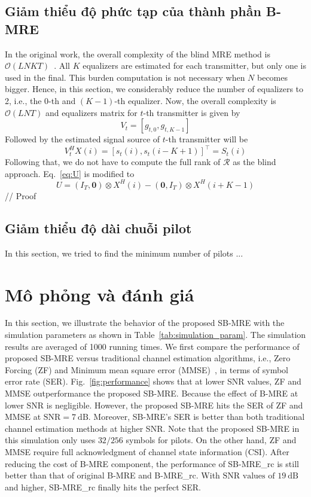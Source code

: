 \subsection{Giảm thiểu độ phức tạp của thành phần B-MRE}
In the original work, the overall complexity of the blind MRE method is $\mathcal{O}(LNKT)$~\cite{original}. All $K$ equalizers are estimated for each transmitter, but only one is used in the final. This burden computation is not necessary when $N$ becomes bigger. Hence, in this section, we considerably reduce the number of equalizers to 2, i.e., the $0$-th and \mbox{$(K-1)$-th} equalizer. Now, the overall complexity is $\mathcal{O}(LNT)$ and equalizers matrix for $t$-th transmitter is given by
\begin{equation}
    V_{t} = [g_{t, 0}, g_{t, K-1}]
\end{equation}
Followed by the estimated signal source of $t$-th transmitter will be
\begin{equation}
    V_t^H X(i) = [s_t(i), s_t(i-K+1)]^\top = S_{t}(i)
\end{equation}
Following that, we do not have to compute the full rank of $\mathcal{R}$ as the blind approach. Eq.~\ref{eq:U} is modified to
\begin{equation*}
U = \left(I_{T}, \mathbf{0}\right) \otimes X^{H}(i)-\left(\mathbf{0}, I_{T}\right) \otimes X^{H}(i+K-1)
\end{equation*}
// Proof 
\subsection{Giảm thiểu độ dài chuỗi pilot}
In this section, we tried to find the minimum number of pilots ...

\section{Mô phỏng và đánh giá}

In this section, we illustrate the behavior of the proposed SB-MRE with the simulation parameters as shown in Table~\ref{tab:simulation_param}. The simulation results are averaged of 1000 running times. We first compare the performance of proposed SB-MRE versus traditional channel estimation algorithms, i.e., Zero Forcing (ZF) and Minimum mean square error (MMSE)~\cite{Jiang2011}, in terms of symbol error rate (SER). Fig.~\ref{fig:performance} shows that at lower SNR values, ZF and MMSE outperformance the proposed SB-MRE. Because the effect of B-MRE at lower SNR is negligible. However, the proposed SB-MRE hits the SER of ZF and MMSE at $\text{SNR}=7~\text{dB}$. Moreover, SB-MRE's SER is better than both traditional channel estimation methods at higher SNR. Note that the proposed SB-MRE in this simulation only uses $32/256$ symbols for pilots. On the other hand, ZF and MMSE require full acknowledgment of channel state information (CSI). After reducing the cost of B-MRE component, the performance of SB-MRE\_rc is still better than that of original B-MRE and B-MRE\_rc. With $\text{SNR values of~}19~\text{dB}$ and higher, SB-MRE\_rc finally hits the perfect SER.



